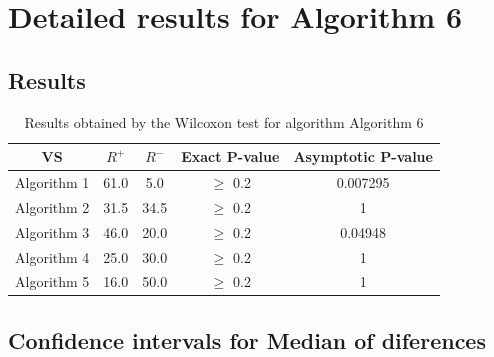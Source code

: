 \documentclass[a4paper,10pt]{article}
\begin{document}
 \clearpage 


\section{Detailed results for Algorithm 6}


\subsection{Results}

\begin{table}[!htp]
\centering\small
\begin{tabular}{
|c|c|c|c|c|}
\hline
 VS & $R^{+}$ & $R^{-}$ & Exact P-value & Asymptotic P-value \\ \hline 
Algorithm 1 & 61.0 & 5.0 & $\geq$ 0.2 & 0.007295\\ \hline 
Algorithm 2 & 31.5 & 34.5 & $\geq$ 0.2 & 1\\ \hline 
Algorithm 3 & 46.0 & 20.0 & $\geq$ 0.2 & 0.04948\\ \hline 
Algorithm 4 & 25.0 & 30.0 & $\geq$ 0.2 & 1\\ \hline 
Algorithm 5 & 16.0 & 50.0 & $\geq$ 0.2 & 1\\ \hline 

\end{tabular}
\caption{Results obtained by the Wilcoxon test for algorithm Algorithm 6}
\end{table}

\subsection{Confidence intervals for Median of diferences}
\end{document}
